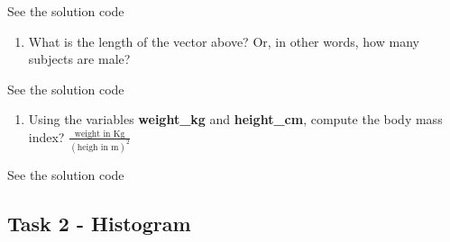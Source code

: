 \documentclass[
]{book}
\newenvironment{Shaded}{\begin{snugshade}}{\end{snugshade}}
\newcommand{\CommentTok}[1]{\textcolor[rgb]{0.56,0.35,0.01}{\textit{#1}}}
\newcommand{\DecValTok}[1]{\textcolor[rgb]{0.00,0.00,0.81}{#1}}
\newcommand{\FunctionTok}[1]{\textcolor[rgb]{0.00,0.00,0.00}{#1}}
\newcommand{\NormalTok}[1]{#1}
\newcommand{\OtherTok}[1]{\textcolor[rgb]{0.56,0.35,0.01}{#1}}
\newcommand{\SpecialCharTok}[1]{\textcolor[rgb]{0.00,0.00,0.00}{#1}}
\newcommand{\StringTok}[1]{\textcolor[rgb]{0.31,0.60,0.02}{#1}}
\providecommand{\tightlist}{%
  \setlength{\itemsep}{0pt}\setlength{\parskip}{0pt}}
\begin{document}
See the solution code

\begin{Shaded}
\end{Shaded}

\begin{enumerate}
\def\labelenumi{\arabic{enumi})}
\setcounter{enumi}{1}
\tightlist
\item
  What is the length of the vector above? Or, in other words, how many subjects
  are male?
\end{enumerate}

See the solution code

\begin{Shaded}
\end{Shaded}

\begin{enumerate}
\def\labelenumi{\arabic{enumi})}
\setcounter{enumi}{2}
\tightlist
\item
  Using the variables \textbf{weight\_kg} and \textbf{height\_cm}, compute the body mass
  index?
  \(\frac{\text{weight in Kg}}{(\text{heigh in m})^2}\)
\end{enumerate}

See the solution code

\begin{Shaded}
\end{Shaded}

\hypertarget{task-2---histogram}{%
\subsection*{Task 2 - Histogram}\label{task-2---histogram}}
\end{document}
